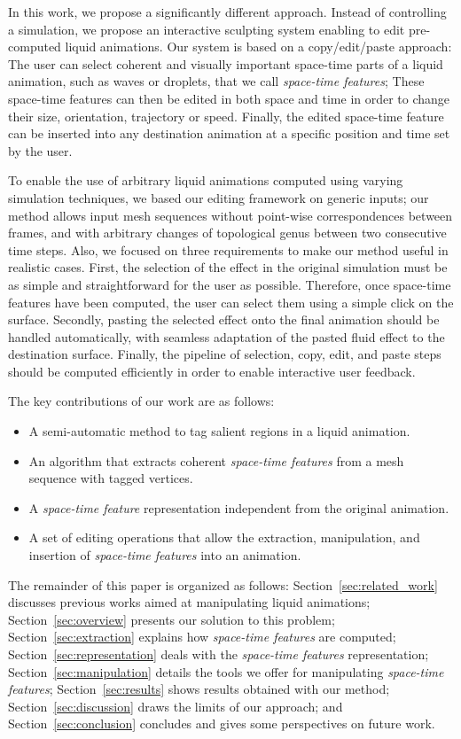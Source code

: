 \documentclass[review]{acmsiggraph}
\begin{document}
In this work, we propose a significantly different approach. 
Instead of controlling a simulation, we propose an interactive sculpting system enabling to edit pre-computed liquid animations.
Our system is based on a copy/edit/paste approach:
The user can select coherent and visually important space-time parts of a liquid animation, such as waves or droplets, that we call \emph{space-time features};
These space-time features can then be edited in both space and time in order to change their size, orientation, trajectory or speed. 
Finally, the edited space-time feature can be inserted into any destination animation at a specific position and time set by the user.

To enable the use of arbitrary liquid animations computed using varying simulation techniques, we based our editing framework on generic inputs; our method allows input mesh sequences without point-wise correspondences between frames, and with arbitrary changes of topological genus between two consecutive time steps. 
Also, we focused on three requirements to make our method useful in realistic cases.
First, the selection of the effect in the original simulation must be as simple and straightforward for the user as possible. 
Therefore, once space-time features have been computed, the user can select them using a simple click on the surface.
Secondly, pasting the selected effect onto the final animation should be handled automatically, with seamless adaptation of the pasted fluid effect to the destination surface. 
Finally, the pipeline of selection, copy, edit, and paste steps should be computed efficiently in order to enable interactive user feedback. 

The key contributions of our work are as follows:
\begin{itemize}
    \item A semi-automatic method to tag salient regions in a liquid animation.
    \item An algorithm that extracts coherent \emph{space-time features} from a mesh sequence with tagged vertices.
    \item A \emph{space-time feature} representation independent from the original animation.
    \item A set of editing operations that allow the extraction, manipulation, and insertion of \emph{space-time features} into an animation.
\end{itemize}

The remainder of this paper is organized as follows:
Section~\ref{sec:related_work} discusses previous works aimed at manipulating liquid animations;
Section~\ref{sec:overview} presents our solution to this problem;
Section~\ref{sec:extraction} explains how \emph{space-time features} are computed; 
Section~\ref{sec:representation} deals with the \emph{space-time features} representation; 
Section~\ref{sec:manipulation} details the tools we offer for manipulating \emph{space-time features}; 
Section~\ref{sec:results} shows results obtained with our method; 
Section~\ref{sec:discussion} draws the limits of our approach; 
and Section~\ref{sec:conclusion} concludes and gives some perspectives on future work.
\end{document}

